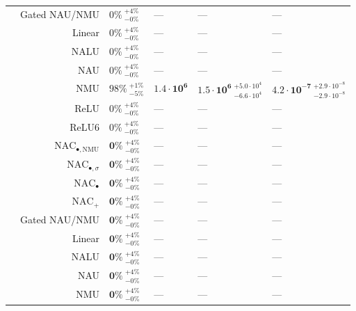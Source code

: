 \begin{longtable}{crllll}
\nopagebreak
 & Gated NAU/NMU & $0\% {~}^{+4\%}_{-0\%}$ & --- & --- & ---\\

\nopagebreak
 & Linear & $0\% {~}^{+4\%}_{-0\%}$ & --- & --- & ---\\

\nopagebreak
 & NALU & $0\% {~}^{+4\%}_{-0\%}$ & --- & --- & ---\\

\nopagebreak
 & NAU & $0\% {~}^{+4\%}_{-0\%}$ & --- & --- & ---\\

\nopagebreak
 & NMU & $98\% {~}^{+1\%}_{-5\%}$ & $\mathbf{1.4 \cdot 10^{6}}$ & $\mathbf{1.5 \cdot 10^{6}} {~}^{+5.0 \cdot 10^{4}}_{-6.6 \cdot 10^{4}}$ & $\mathbf{4.2 \cdot 10^{-7}} {~}^{+2.9 \cdot 10^{-8}}_{-2.9 \cdot 10^{-8}}$\\

\nopagebreak
 & ReLU & $0\% {~}^{+4\%}_{-0\%}$ & --- & --- & ---\\

\nopagebreak
\multirow{-11}{*}{\centering\arraybackslash $\bm{\times}$} & ReLU6 & $0\% {~}^{+4\%}_{-0\%}$ & --- & --- & ---\\
\cmidrule{1-6}
 & $\mathrm{NAC}_{\bullet,\mathrm{NMU}}$ & $\mathbf{0\%} {~}^{+4\%}_{-0\%}$ & --- & --- & ---\\

\nopagebreak
 & $\mathrm{NAC}_{\bullet,\sigma}$ & $\mathbf{0\%} {~}^{+4\%}_{-0\%}$ & --- & --- & ---\\

\nopagebreak
 & $\mathrm{NAC}_{\bullet}$ & $\mathbf{0\%} {~}^{+4\%}_{-0\%}$ & --- & --- & ---\\

\nopagebreak
 & $\mathrm{NAC}_{+}$ & $\mathbf{0\%} {~}^{+4\%}_{-0\%}$ & --- & --- & ---\\

\nopagebreak
 & Gated NAU/NMU & $\mathbf{0\%} {~}^{+4\%}_{-0\%}$ & --- & --- & ---\\

\nopagebreak
 & Linear & $\mathbf{0\%} {~}^{+4\%}_{-0\%}$ & --- & --- & ---\\

\nopagebreak
 & NALU & $\mathbf{0\%} {~}^{+4\%}_{-0\%}$ & --- & --- & ---\\

\nopagebreak
 & NAU & $\mathbf{0\%} {~}^{+4\%}_{-0\%}$ & --- & --- & ---\\

\nopagebreak
 & NMU & $\mathbf{0\%} {~}^{+4\%}_{-0\%}$ & --- & --- & ---\\


\end{longtable}
